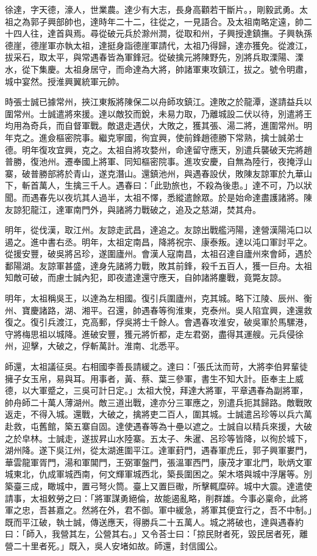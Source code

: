 
\begin{pinyinscope}
徐達，字天德，濠人，世業農。達少有大志，長身高顴若干斷片。，剛毅武勇。太祖之為郭子興部帥也，達時年二十二，往從之，一見語合。及太祖南略定遠，帥二十四人往，達首與焉。尋從破元兵於滁州澗，從取和州，子興授達鎮撫。子興執孫德崖，德崖軍亦執太祖，達挺身詣德崖軍請代，太祖乃得歸，達亦獲免。從渡江，拔采石，取太平，與常遇春皆為軍鋒冠。從破擒元將陳野先，別將兵取溧陽、溧水，從下集慶。太祖身居守，而命達為大將，帥諸軍東攻鎮江，拔之。號令明肅，城中宴然。授淮興翼統軍元帥。

時張士誠已據常州，挾江東叛將陳保二以舟師攻鎮江。達敗之於龍潭，遂請益兵以圍常州。士誠遣將來援。達以敵狡而銳，未易力取，乃離城設二伏以待，別遣將王均用為奇兵，而自督軍戰。敵退走遇伏，大敗之，獲其張、湯二將，進圍常州。明年克之。進僉樞密院事。繼克寧國，徇宜興，使前鋒趙德勝下常熟，擒士誠弟士德。明年復攻宜興，克之。太祖自將攻婺州，命達留守應天，別遣兵襲破天完將趙普勝，復池州。遷奉國上將軍、同知樞密院事。進攻安慶，自無為陸行，夜掩浮山寨，破普勝部將於青山，遂克潛山。還鎮池州，與遇春設伏，敗陳友諒軍於九華山下，斬首萬人，生擒三千人。遇春曰：「此勁旅也，不殺為後患。」達不可，乃以狀聞。而遇春先以夜坑其人過半，太祖不懌，悉縱遣餘眾。於是始命達盡護諸將。陳友諒犯龍江，達軍南門外，與諸將力戰破之，追及之慈湖，焚其舟。

明年，從伐漢，取江州。友諒走武昌，達追之。友諒出戰艦沔陽，達營漢陽沌口以遏之。進中書右丞。明年，太祖定南昌，降將祝宗、康泰叛。達以沌口軍討平之。從援安豐，破吳將呂珍，遂圍廬州。會漢人寇南昌，太祖召達自廬州來會師，遇於鄱陽湖。友諒軍甚盛，達身先諸將力戰，敗其前鋒，殺千五百人，獲一巨舟。太祖知敵可破，而慮士誠內犯，即夜遣達還守應天，自帥諸將鏖戰，竟斃友諒。

明年，太祖稱吳王，以達為左相國。復引兵圍廬州，克其城。略下江陵、辰州、衡州、寶慶諸路，湖、湘平。召還，帥遇春等徇淮東，克泰州。吳人陷宜興，達還救復之。復引兵渡江，克高郵，俘吳將士千餘人。會遇春攻淮安，破吳軍於馬騾港，守將梅思祖以城降。進破安豐，獲元將忻都，走左君弼，盡得其運艘。元兵侵徐州，迎擊，大破之，俘斬萬計。淮南、北悉平。

師還，太祖議征吳。右相國李善長請緩之。達曰：「張氏汰而苛，大將李伯昇輩徒擁子女玉帛，易與耳。用事者，黃、蔡、葉三參軍，書生不知大計。臣奉主上威德，以大軍蹙之，三吳可計日定。」太祖大悅，拜達大將軍，平章遇春為副將軍，帥舟師二十萬人薄湖州。敵三道出戰，達亦分三軍應之，別遣兵扼其歸路。敵戰敗返走，不得入城。還戰，大破之，擒將吏二百人，圍其城。士誠遣呂珍等以兵六萬赴救，屯舊館，築五寨自固。達使遇春等為十壘以遮之。士誠自以精兵來援，大破之於皁林。士誠走，遂拔昇山水陸寨。五太子、朱暹、呂珍等皆降，以徇於城下，湖州降。遂下吳江州，從太湖進圍平江。達軍葑門，遇春軍虎丘，郭子興軍婁門，華雲龍軍胥門，湯和軍閶門，王弼軍盤門，張溫軍西門，康茂才軍北門，耿炳文軍城東北，仇成軍城西南，何文輝軍城西北，築長圍困之。架木塔與城中浮屠等。別築臺三成，瞰城中，置弓弩火筒。臺上又置巨礮，所擊輒糜碎。城中大震。達遣使請事，太祖敕勞之曰：「將軍謀勇絕倫，故能遏亂略，削群雄。今事必稟命，此將軍之忠，吾甚嘉之。然將在外，君不御。軍中緩急，將軍其便宜行之，吾不中制。」既而平江破，執士誠，傳送應天，得勝兵二十五萬人。城之將破也，達與遇春約曰：「師入，我營其左，公營其右。」又令荅士曰：「掠民財者死，毀民居者死，離營二十里者死。」既入，吳人安堵如故。師還，封信國公。


\end{pinyinscope}
